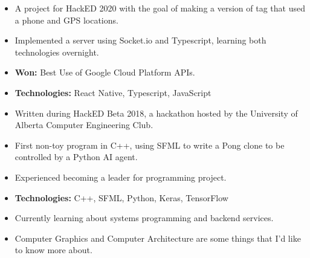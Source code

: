 \documentclass[10pt,a4paper,ragged2e,academicons]{altacv}
\begin{document}
\begin{paracol}{2}
  \begin{itemize}
    \item A project for HackED 2020 with the goal of making a version of tag that used a phone and GPS locations.
    \item Implemented a server using Socket.io and Typescript, learning both technologies overnight.
    \item \textbf{Won:} Best Use of Google Cloud Platform APIs.
    \item \textbf{Technologies:} React Native, Typescript, JavaScript
  \end{itemize}
  \divider\small

  \begin{itemize}
    \item Written during HackED Beta 2018, a hackathon hosted by the University of Alberta Computer Engineering Club.
    \item First non-toy program in C++, using SFML to write a Pong clone to be controlled by a Python AI agent.
    \item Experienced becoming a leader for programming project.
    \item \textbf{Technologies:} C++, SFML, Python, Keras, TensorFlow
  \end{itemize}
  \divider\small

  \nocite{*}

  \switchcolumn



  \cvtag{\LaTeX}



  \begin{itemize}
    \item Currently learning about systems programming and backend services.
    \item Computer Graphics and Computer \newline Architecture are some things that I'd like to know more about.
  \end{itemize}


\end{paracol}
\end{document}
